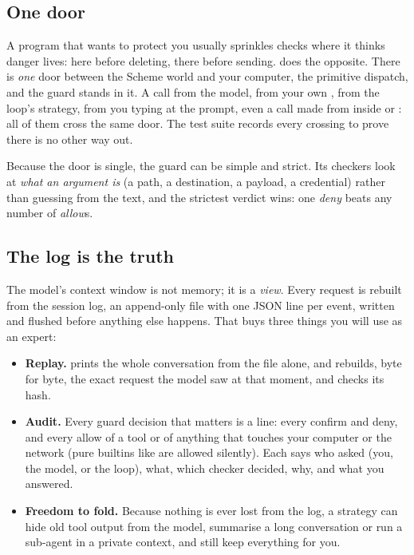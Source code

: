 \subsection{One door}

A program that wants to protect you usually sprinkles checks where it
thinks danger lives: here before deleting, there before sending. \nodwyn{}
does the opposite. There is \emph{one} door between the Scheme world and your
computer, the primitive dispatch, and the guard stands in it. A call from
the model, from your own , from the loop's strategy, from you
typing at the prompt, even a call made from inside  or
: all of them cross the same door. The test suite records every
crossing to prove there is no other way out.

Because the door is single, the guard can be simple and strict. Its
checkers look at \emph{what an argument is} (a path, a destination, a
payload, a credential) rather than guessing from the text, and the strictest
verdict wins: one \emph{deny} beats any number of \emph{allow}s.

\subsection{The log is the truth}

The model's context window is not memory; it is a \emph{view}. Every
request is rebuilt from the session log, an append-only file with one JSON
line per event, written and flushed before anything else happens. That buys
three things you will use as an expert:

\begin{itemize}
  \item \textbf{Replay.}  prints the whole
    conversation from the file alone, and  rebuilds, byte for byte, the exact request the model saw at that
    moment, and checks its hash.
  \item \textbf{Audit.} Every guard decision that matters is a line: every
    confirm and deny, and every allow of a tool or of anything that touches
    your computer or the network (pure builtins like \code{+} are allowed
    silently). Each says who asked (you, the model, or the loop), what,
    which checker decided, why, and what you answered.
  \item \textbf{Freedom to fold.} Because nothing is ever lost from the log,
    a strategy can hide old tool output from the model, summarise a long
    conversation or run a sub-agent in a private context, and still keep
    everything for you.
\end{itemize}

